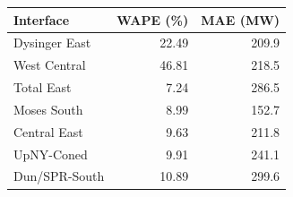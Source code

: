 \begin{tabular}{lrr}
\toprule
Interface & WAPE (\%) & MAE (MW) \\
\midrule
Dysinger East & 22.49 & 209.9 \\
West Central & 46.81 & 218.5 \\
Total East & 7.24 & 286.5 \\
Moses South & 8.99 & 152.7 \\
Central East & 9.63 & 211.8 \\
UpNY-Coned & 9.91 & 241.1 \\
Dun/SPR-South & 10.89 & 299.6 \\
\bottomrule
\end{tabular}
